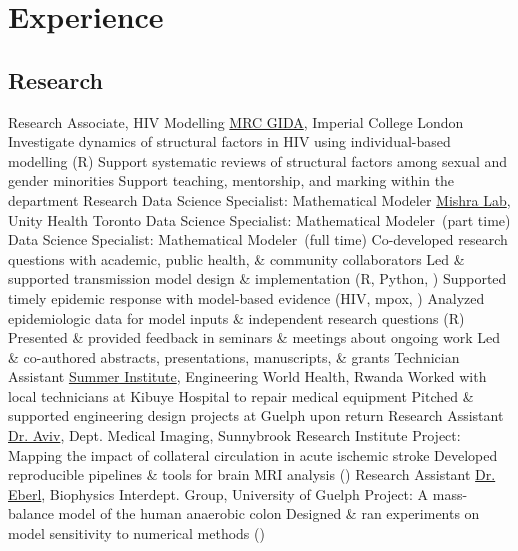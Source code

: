 \section{Experience}\twodate
\subsection{Research}
  {Research Associate, HIV Modelling}
  {\href{https://www.imperial.ac.uk/mrc-global-infectious-disease-analysis}{MRC GIDA}, Imperial College London}
  \bullet Investigate dynamics of structural factors in HIV using individual-based modelling (R)
  \bullet Support systematic reviews of structural factors among sexual and gender minorities
  \bullet Support teaching, mentorship, and marking within the department
  {Research Data Science Specialist: Mathematical Modeler}
  {\href{http://mishra-lab.ca}{Mishra Lab}, Unity Health Toronto}
  {Data Science Specialist: Mathematical Modeler~\textnormal{(part time)}}{}
  {Data Science Specialist: Mathematical Modeler~\textnormal{(full time)}}{}
  \bullet Co-developed research questions with academic, public health, \& community collaborators
  \bullet Led \& supported transmission model design \& implementation (R, Python, \matlab)
  \bullet Supported timely epidemic response with model-based evidence (HIV, mpox, \covid)
  \bullet Analyzed epidemiologic data for model inputs \& independent research questions (R)
  \bullet Presented \& provided feedback in seminars \& meetings about ongoing work
  \bullet Led \& co-authored abstracts, presentations, manuscripts, \& grants
  {Technician Assistant}
  {\href{https://web.archive.org/web/https://ewh.org/the-institutes/summer-institute-programs/}{Summer Institute}, Engineering World Health, Rwanda}
  \bullet Worked with local technicians at Kibuye Hospital to repair medical equipment
  \bullet Pitched \& supported engineering design projects at Guelph upon return
  {Research Assistant}
  {\href{https://www.uottawa.ca/brain/people/aviv-richard}{Dr. Aviv}, Dept. Medical Imaging, Sunnybrook Research Institute}
  \bullet Project: Mapping the impact of collateral circulation in acute ischemic stroke
  \bullet Developed reproducible pipelines \& tools for brain MRI analysis (\matlab)
  {Research Assistant}
  {\href{https://www.heberl.uoguelph.ca}{Dr. Eberl}, Biophysics Interdept. Group, University of Guelph}
  \bullet Project: A mass-balance model of the human anaerobic colon
  \bullet Designed \& ran experiments on model sensitivity to numerical methods (\matlab)
\clearpage %

